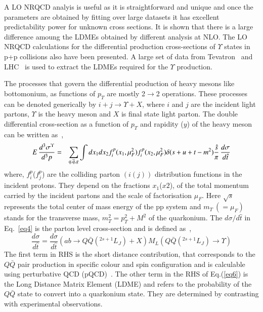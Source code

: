 A LO NRQCD analyis is useful as it is straightforward and unique and once the parameters are
obtained by fitting over large datasets it has excellent predictability power for unknown cross
sections.
 It is shown that there is a large difference amoung the LDMEs obtained by different
analysis at NLO.
The LO NRQCD calculations for the differential production
cross-sections of $\Upsilon$ states in p+p collisions also have been presented.
A large set of data from Tevatron~\cite{Acosta:2001gv} and
LHC~\cite{LHCb:2012aa,Khachatryan:2015qpa,Aad:2012dlq,Chatrchyan:2013yna,Sirunyan:2017qdw} 
is used to extract the LDMEs required for the $\Upsilon$ production.

The processes that govern the differential
production of heavy mesons like bottomonium, as functions of $p_T$ are mostly
2$\rightarrow$2 operations. These processes can be denoted generically by 
$i+j\rightarrow \Upsilon +X$, where $i$ and $j$ are the incident light partons,
$\Upsilon$ is the heavy meson and $X$ is final state light parton.
The double differential cross-section as a function of $p_T$ and rapidity ($y$) of 
the heavy meson can be written as~\cite{Kumar:2016ojy},
\begin{eqnarray}
  \nonumber
  E\,\frac{d^3\sigma^{\Upsilon} }{d^3p} &=& \sum_{q,\overline{q},g} \int dx_1 dx_2 f_{i}^p(x_1,\mu_F^2)
  f_{i}^p(x_2,\mu_F^2) \delta(s+u+t-m^2) {\hat{s} \over \pi} \, \frac{d\sigma}{d\hat{t}}
  \label{eq4}
\end{eqnarray}
where, $f_{i}^p$($f_{j}^p$) are the colliding parton $(i(j))$ distribution functions in
the incident protons. They depend on the fractions $x_1$($x2$), of the total momentum
carried by the incident partons and the scale of factorisation $\mu_F$.
Here $\sqrt{s}$ represents the total center of mass energy of the pp system and $m_T~(=\mu_F)$ stands for
the transverse mass, $m_T^2=p_T^2 + M^2$ of the quarkonium.
The ${d\sigma}/{d\hat{t}}$ in Eq.~\ref{eq4} is the parton level cross-section and is
defined as~\cite{Bodwin:1994jh},
\begin{equation}
  \frac{d\sigma}{d\hat{t}} = \frac{d\sigma}{d\hat{t}}(ab\rightarrow Q\bar{Q}(^{2s+1}L_J)+X)
  M_L(Q\bar{Q}(^{2s+1}L_J)\rightarrow \Upsilon)
  \label{eq6}
\end{equation}
The first term in RHS is the short distance contribution, that corresponds to the $Q\bar{Q}$
pair production in specific colour and spin configuration and is calculable using 
perturbative QCD (pQCD)~\cite{Braaten:2000cm,Baier:1983va,Humpert:1986cy,Gastmans:1987be,Cho:1995vh,Cho:1995ce}.
The other term in the RHS of Eq.(\ref{eq6}) is the Long Distance Matrix Element (LDME)
and refers to the probability of the $Q\bar{Q}$ state to convert into a quarkonium state.
They are determined by contrasting with experimental observations. 




